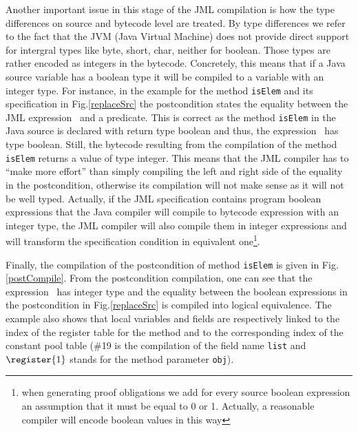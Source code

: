 \begin{enumerate}
Another important issue in this stage of the JML compilation is how the type differences on source and bytecode level are treated. 
By type differences we refer to the fact that the JVM (Java Virtual Machine) does not provide direct support for intergral types like byte, short, char, neither for boolean. Those types are rather encoded as integers in the bytecode. Concretely, this means that 
if a Java source variable has a boolean type it will be compiled to a variable with
an integer type. For instance, in the example for the method 
\texttt{isElem} and its specification in Fig.\ref{replaceSrc} the postcondition states the equality between the JML expression  
\result \ and a predicate. This is correct as the method \texttt{isElem} in the Java source is declared with return type boolean  and thus,
 the expression \result \ has type boolean. 
Still, the bytecode resulting from the compilation of the method  \texttt{isElem} returns a value of type integer. This means that the JML compiler has to 
``make more effort'' than simply compiling the left and right side of the equality in the postcondition, otherwise its compilation will not make sense as 
it will not be well typed. Actually, if the JML specification contains program boolean expressions that the Java compiler will compile to bytecode expression
 with an integer type, the JML compiler will also compile them in integer expressions and will transform the specification condition in equivalent 
one\footnote{when generating proof obligations we add for every source boolean expression an assumption that it
 must be equal to 0 or 1. Actually, a reasonable compiler will encode boolean values in this way}.  

Finally, the compilation of the postcondition of method \texttt{isElem} is given in Fig. \ref{postCompile}. From the postcondition compilation,
 one can see that the expression \result \ has integer type and the equality between the boolean expressions in the postcondition in Fig.\ref{replaceSrc} is
 compiled into logical equivalence. The example also 
shows that local variables and  fields are respectively linked to the index of the register table for the method and to the corresponding 
index of the constant pool table 
(\#19 is the compilation of the field name \texttt{list} and $\register{1}$ stands for the method parameter \texttt{obj}). 


\end{enumerate}

